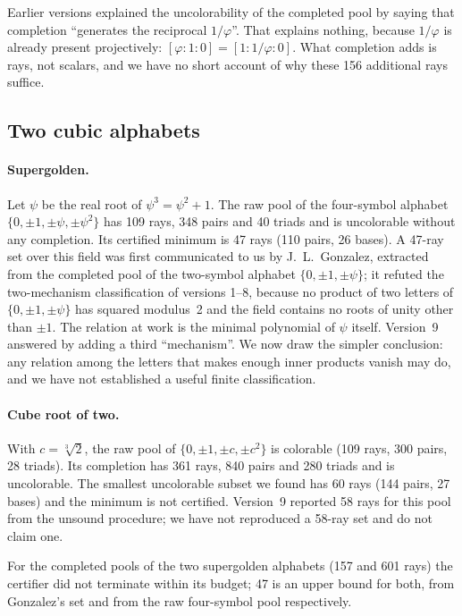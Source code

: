Earlier versions explained the uncolorability of the completed pool by saying that completion
``generates the reciprocal $1/\varphi$''.  That explains nothing, because $1/\varphi$ is already
present projectively: $[\varphi:1:0]=[1:1/\varphi:0]$.  What completion adds is rays, not
scalars, and we have no short account of why these 156 additional rays suffice.

\subsection{Two cubic alphabets}

\paragraph{Supergolden.}  Let $\psi$ be the real root of $\psi^3=\psi^2+1$.  The raw pool of the
four-symbol alphabet $\{0,\pm1,\pm\psi,\pm\psi^2\}$ has 109 rays, 348 pairs and 40 triads and is
uncolorable without any completion.  Its certified minimum is 47 rays (110 pairs, 26 bases).  A
47-ray set over this field was first communicated to us by J.~L.~Gonzalez, extracted from the
completed pool of the two-symbol alphabet $\{0,\pm1,\pm\psi\}$; it refuted the two-mechanism
classification of versions 1--8, because no product of two letters of $\{0,\pm1,\pm\psi\}$ has squared
modulus~2 and the field contains no roots of unity other than $\pm1$.  The relation at work is
the minimal polynomial of $\psi$ itself.  Version~9 answered by adding a third ``mechanism''.  We
now draw the simpler conclusion: any relation among the letters that makes enough inner products
vanish may do, and we have not established a useful finite classification.

\paragraph{Cube root of two.}  With $c=\sqrt[3]2$, the raw pool of $\{0,\pm1,\pm c,\pm c^2\}$ is
colorable (109 rays, 300 pairs, 28 triads).  Its completion has 361 rays, 840 pairs and 280 triads and is
uncolorable.  The smallest uncolorable subset we found has 60 rays (144 pairs, 27 bases) and the
minimum is not certified.  Version~9 reported 58 rays for this pool from the unsound procedure;
we have not reproduced a 58-ray set and do not claim one.

For the completed pools of the two supergolden alphabets (157 and 601 rays) the certifier did not
terminate within its budget; 47 is an upper bound for both, from Gonzalez's set and from the raw
four-symbol pool respectively.

